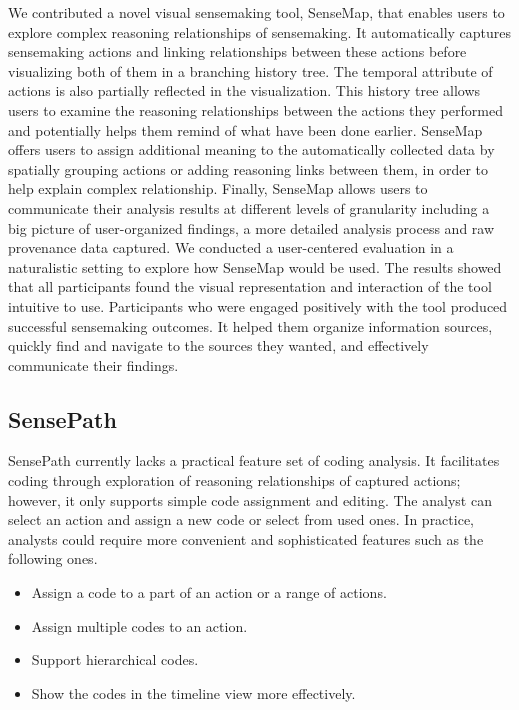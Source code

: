 We contributed a novel visual sensemaking tool, SenseMap, that enables users to explore complex reasoning relationships of sensemaking. It automatically captures sensemaking actions and linking relationships between these actions before visualizing both of them in a branching history tree. The temporal attribute of actions is also partially reflected in the visualization. This history tree allows users to examine the reasoning relationships between the actions they performed and potentially helps them remind of what have been done earlier. SenseMap offers users to assign additional meaning to the automatically collected data by spatially grouping actions or adding reasoning links between them, in order to help explain complex relationship. Finally, SenseMap allows users to communicate their analysis results at different levels of granularity including a big picture of user-organized findings, a more detailed analysis process and raw provenance data captured. We conducted a user-centered evaluation in a naturalistic setting to explore how SenseMap would be used. The results showed that all participants found the visual representation and interaction of the tool intuitive to use. Participants who were engaged positively with the tool produced successful sensemaking outcomes. It helped them organize information sources, quickly find and navigate to the sources they wanted, and effectively communicate their findings.

\subsection{SensePath}
SensePath currently lacks a practical feature set of coding analysis. It facilitates coding through exploration of reasoning relationships of captured actions; however, it only supports simple code assignment and editing. The analyst can select an action and assign a new code or select from used ones. In practice, analysts could require more convenient and sophisticated features such as the following ones.
	\begin{itemize}
		\item Assign a code to a part of an action or a range of actions.
		\item Assign multiple codes to an action.
		\item Support hierarchical codes.
		\item Show the codes in the timeline view more effectively.
	\end{itemize}


